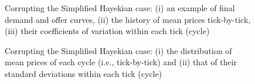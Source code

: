 \documentclass[10pt]{report}
\begin{document}
\begin{appendices}
\begin{figure}[H]
\begin{center}
\caption{Corrupting the Simplified Hayekian case: (i) an example of final demand and offer curves, (ii) the history of mean prices tick-by-tick, (iii) their coefficients of variation within each tick (cycle)}
\label{output_3_2B1.png}
\end{center}
\end{figure}

\begin{figure}[H]
\begin{center}
\caption{Corrupting the Simplified Hayekian case: (i) the distribution of mean prices of each cycle (i.e., tick-by-tick) and (ii) that of their standard deviations within each tick (cycle)}
\label{output_3_3B1.png}
\end{center}
\end{figure}


\end{appendices}
\end{document}
